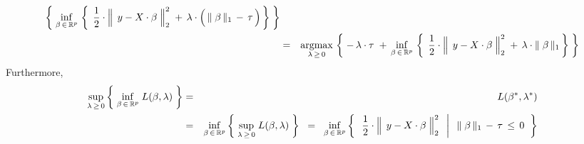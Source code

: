 \begin{theorem}
\begin{enumerate}
\begin{eqnarray*}
		\left\{\;
			\underset{\beta\,\in\,\Re^{p}}{\inf}\,
			\left\{\;\,
				\dfrac{1}{2}
				\cdot
				\left\Vert\;\, y \overset{{\color{white}.}}{-} X\cdot\beta \;\right\Vert_{2}^{2}
				\; + \,
				\lambda
				\cdot
				\left(\, \Vert\;\beta\,\Vert_{1} \, \overset{{\color{white}.}}{-} \, \tau \,\right)
				\,\right\}
			\;\right\}
	\\
	& = &
		\underset{\lambda\,\geq\,0}{\argmax}\,
		\left\{\;
			-\,\lambda\cdot\tau
			\; + \,
			\underset{\beta\,\in\,\Re^{p}}{\inf}\,
			\left\{\;\,
				\dfrac{1}{2}
				\cdot
				\left\Vert\;\, y \overset{{\color{white}.}}{-} X\cdot\beta \;\right\Vert_{2}^{2}
				\; + \,
				\lambda \cdot \Vert\;\beta\,\Vert_{1} 
				\,\right\}
			\;\right\}
	\end{eqnarray*}
	Furthermore,
	\begin{eqnarray*}
	\underset{\lambda\,\geq\,0}{\sup}
	\left\{\;
		\underset{\beta\,\in\,\Re^{p}}{\inf}\; L(\beta,\lambda)
		\;\right\}
	& = &
		L(\beta^{*},\lambda^{*})
	\\
	& = &
		\underset{\beta\,\in\,\Re^{p}}{\inf}
		\left\{\;
			\underset{\lambda\,\geq\,0}{\sup}\; L(\beta,\lambda)
			\;\right\}
	\;\; = \;\;
		\underset{\beta\,\in\,\Re^{p}}{\inf}
		\left\{\;\;
			\left.
			\dfrac{1}{2}
			\cdot
			\left\Vert\;\, y \overset{{\color{white}.}}{-} X\cdot\beta \;\right\Vert_{2}^{2}
			\;\;\,\right\vert\;\;
			\Vert\;\beta\,\Vert_{1} \, - \, \tau \, \leq \, 0
			\;\;\right\}
	\end{eqnarray*}
\end{enumerate}
\end{theorem}


\renewcommand{\theenumi}{\roman{enumi}}
\renewcommand{\labelenumi}{\textnormal{(\theenumi)}$\;\;$}

